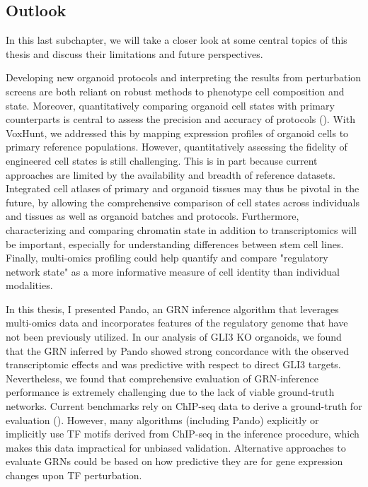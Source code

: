 \subsection{Outlook}

In this last subchapter, we will take a closer look at some central topics of this thesis and discuss their limitations and future perspectives.

Developing new organoid protocols and interpreting the results from perturbation screens are both reliant on robust methods to phenotype cell composition and state. Moreover, quantitatively comparing organoid cell states with primary counterparts is central to assess the precision and accuracy of protocols (\cite{camp_single-cell_2018}). With VoxHunt, we addressed this by mapping expression profiles of organoid cells to primary reference populations. However, quantitatively assessing the fidelity of engineered cell states is still challenging. This is in part because current approaches are limited by the availability and breadth of reference datasets. Integrated cell atlases of primary and organoid tissues may thus be pivotal in the future, by allowing the comprehensive comparison of cell states across individuals and tissues as well as organoid batches and protocols. Furthermore, characterizing and comparing chromatin state in addition to transcriptomics will be important, especially for understanding differences between stem cell lines. Finally, multi-omics profiling could help quantify and compare "regulatory network state" as a more informative measure of cell identity than individual modalities.


In this thesis, I presented Pando, an GRN inference algorithm that leverages multi-omics data and incorporates features of the regulatory genome that have not been previously utilized. In our analysis of GLI3 KO organoids, we found that the GRN inferred by Pando showed strong concordance with the observed transcriptomic effects and was predictive with respect to direct GLI3 targets. Nevertheless, we found that comprehensive evaluation of GRN-inference performance is extremely challenging due to the lack of viable ground-truth networks. Current benchmarks rely on ChIP-seq data to derive a ground-truth for evaluation (\cite{pratapa_benchmarking_2020}). However, many algorithms (including Pando) explicitly or implicitly use TF motifs derived from ChIP-seq in the inference procedure, which makes this data impractical for unbiased validation. Alternative approaches to evaluate GRNs could be based on how predictive they are for gene expression changes upon TF perturbation. 

